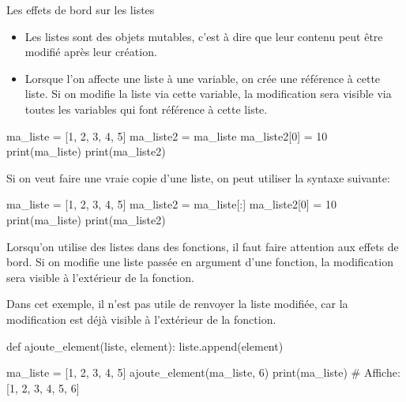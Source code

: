 \begin{easybox}{Les effets de bord sur les listes}{}
	\begin{itemize}
		\item Les listes sont des objets mutables, c'est à dire que leur contenu peut être modifié après leur création.
		\item Lorsque l'on affecte une liste à une variable, on crée une référence à cette liste. Si on modifie la liste via cette variable, la modification sera visible via toutes les variables qui font référence à cette liste.
	\end{itemize}

\begin{ConsolePythontex}[TaillePolice=\normalsize, Label=false]{}
ma_liste = [1, 2, 3, 4, 5]
ma_liste2 = ma_liste
ma_liste2[0] = 10
print(ma_liste)
print(ma_liste2)
		\end{ConsolePythontex}
\end{easybox}

Si on veut faire une vraie copie d'une liste, on peut utiliser la syntaxe suivante:
	\begin{ConsolePythontex}[TaillePolice=\normalsize, Label=false]{}
ma_liste = [1, 2, 3, 4, 5]
ma_liste2 = ma_liste[:]
ma_liste2[0] = 10
print(ma_liste)
print(ma_liste2)
		\end{ConsolePythontex}

Lorsqu'on utilise des listes dans des fonctions, il faut faire attention aux effets de bord. Si on modifie une liste passée en argument d'une fonction, la modification sera visible à l'extérieur de la fonction.

Dans cet exemple, il n'est pas utile de renvoyer la liste modifiée, car la modification est déjà visible à l'extérieur de la fonction.
\begin{CodePythontexAlt}[TaillePolice=\normalsize, Largeur=1\linewidth,Centre,PremLigne=1, Lignes=true]{}	
def ajoute_element(liste, element):
	liste.append(element)

ma_liste = [1, 2, 3, 4, 5]
ajoute_element(ma_liste, 6)
print(ma_liste)			# Affiche: [1, 2, 3, 4, 5, 6]
		\end{CodePythontexAlt}

		\pagebreak

